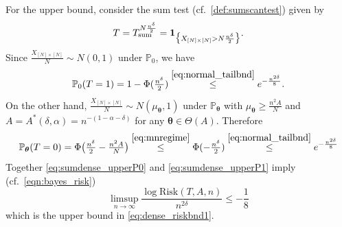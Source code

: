 \documentclass[11pt,reqno,letterpaper]{amsart}
\numberwithin{equation}{section}
\theoremstyle{plain}
\def \btheta{\boldsymbol{\theta}}
\def \P{\mathbb{P}}
\begin{document}
\smallskip

 For the upper bound, consider the sum test (cf.~\eqref{def:sumscantest}) given by
\begin{equation*}%
T = T_{{\rm sum}}^{N \frac{n^{\delta}}2} = \mathbf{1}_{\big\{X_{[N]\times[N]} > N \frac{n^{\delta}}2\big\}}.    
\end{equation*}
Since $\frac{X_{[N]\times[N]}}{N} \sim N(0, 1)$ under $\P_0$, we have
\begin{equation}\label{eq:sumdense_upperP0}
\P_0(T = 1) = 1 - \Phi(\tfrac{n^{\delta}}2) \stackrel{\eqref{eq:normal_tailbnd}}{\le} e^{-\frac{n^{2\delta}}8}.
\end{equation}
On the other hand, $\tfrac{X_{[N]\times[N]}}{N} \sim N(\mu_{\btheta}, 1)$ 
under $\P_{\btheta}$ with $\mu_{\btheta} \ge \tfrac{n^2A}{N}$ and $A = A^\ast(\delta, \alpha) = n^{-(1 - \alpha - \delta)}$ for any $\btheta \in \Theta(A)$. Therefore
\begin{equation}\label{eq:sumdense_upperP1}
\P_{\btheta}(T = 0) = \Phi\big(\tfrac{n^{\delta}}2 - \tfrac{n^2A}{N}\big) \stackrel{\eqref{eq:mnregime}}{\le} \Phi(-\tfrac{n^{\delta}}2) \stackrel{\eqref{eq:normal_tailbnd}}{\le} e^{-\frac{n^{2\delta}}8}
\end{equation}
Together \eqref{eq:sumdense_upperP0} and \eqref{eq:sumdense_upperP1} imply (cf.~\eqref{eqn:bayes_risk})
\begin{equation*}%
\limsup_{n\rightarrow \infty}\frac{\log{\mathrm{Risk}(T,A,n)}}{n^{2\delta}} \le  -\frac18
\end{equation*}
which is the upper bound in \eqref{eq:dense_riskbnd1}.

\smallskip
\end{document}
